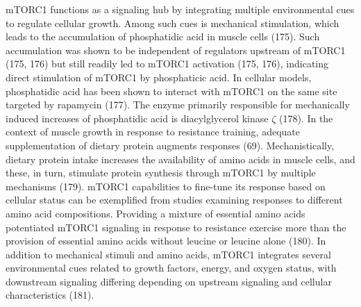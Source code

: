\documentclass[twoside,10pt]{gihclass} %
\begin{document}
mTORC1 functions as a signaling hub by integrating multiple environmental cues to regulate cellular growth. Among such cues is mechanical stimulation, which leads to the accumulation of phosphatidic acid in muscle cells
(175).
Such accumulation was shown to be independent of regulators upstream of mTORC1
(175, 176)
but still readily led to mTORC1 activation
(175, 176), indicating direct stimulation of mTORC1 by phosphaticic acid.
In cellular models, phosphatidic acid has been shown to interact with mTORC1 on the same site targeted by rapamycin
(177).
The enzyme primarily responsible for mechanically induced increases of phosphatidic acid is diacylglycerol kinase \(\zeta\)
(178).
In the context of muscle growth in response to resistance training, adequate supplementation of dietary protein augments responses
(69).
Mechanistically, dietary protein intake increases the availability of amino acids in muscle cells, and these, in turn, stimulate protein synthesis through mTORC1 by multiple mechanisms
(179).
mTORC1 capabilities to fine-tune its response based on cellular status can be exemplified from studies examining responses to different amino acid compositions.
Providing a mixture of essential amino acids potentiated mTORC1 signaling in response to resistance exercise more than the provision of essential amino acids without leucine or leucine alone
(180).
In addition to mechanical stimuli and amino acids, mTORC1 integrates several environmental cues related to growth factors, energy, and oxygen status, with downstream signaling differing depending on upstream signaling and cellular characteristics
(181).
\end{document}
